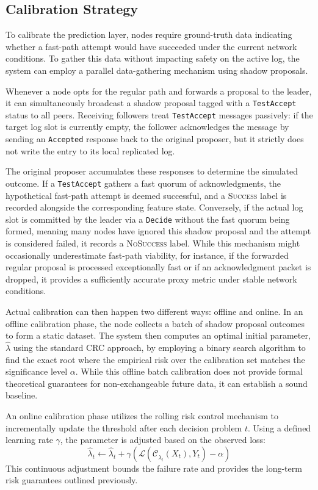 \subsection{Calibration Strategy}
To calibrate the prediction layer, nodes require ground-truth data indicating whether a fast-path attempt would have succeeded under the current network conditions. To gather this data without impacting safety on the active log, the system can employ a parallel data-gathering mechanism using shadow proposals.

Whenever a node opts for the regular path and forwards a proposal to the leader, it can simultaneously broadcast a shadow proposal tagged with a \texttt{TestAccept} status to all peers. Receiving followers treat \texttt{TestAccept} messages passively: if the target log slot is currently empty, the follower acknowledges the message by sending an \texttt{Accepted} response back to the original proposer, but it strictly does not write the entry to its local replicated log.

The original proposer accumulates these responses to determine the simulated outcome. If a \texttt{TestAccept} gathers a fast quorum of acknowledgments, the hypothetical fast-path attempt is deemed successful, and a \textsc{Success} label is recorded alongside the corresponding feature state. Conversely, if the actual log slot is committed by the leader via a \texttt{Decide} without the fast quorum being formed, meaning many nodes have ignored this shadow proposal and the attempt is considered failed, it records a \textsc{NoSuccess} label. While this mechanism might occasionally underestimate fast-path viability, for instance, if the forwarded regular proposal is processed exceptionally fast or if an acknowledgment packet is dropped, it provides a sufficiently accurate proxy metric under stable network conditions.

Actual calibration can then happen two different ways: offline and online. In an offline calibration phase, the node collects a batch of shadow proposal outcomes to form a static dataset. The system then computes an optimal initial parameter, $\widehat{\lambda}$ using the standard \gls{CRC} approach, by employing a binary search algorithm to find the exact root where the empirical risk over the calibration set matches the significance level $\alpha$. While this offline batch calibration does not provide formal theoretical guarantees for non-exchangeable future data, it can establish a sound baseline.

An online calibration phase utilizes the rolling risk control mechanism to incrementally update the threshold after each decision problem $t$. Using a defined learning rate $\gamma$, the parameter is adjusted based on the observed loss:
$$\widehat{\lambda}_{t} \leftarrow \widehat{\lambda}_t + \gamma \left( \mathcal{L}(\mathcal{C}_{\hat{\lambda}_t}(X_t), Y_t) - \alpha \right)$$
This continuous adjustment bounds the failure rate and provides the long-term risk guarantees outlined previously.

